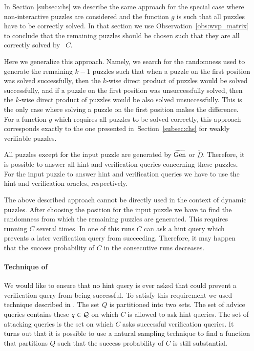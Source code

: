 In Section \ref{subsec:chs} we describe the same approach for the special case where
non-interactive puzzles are considered and the function $g$ is such that all puzzles have to be correctly solved.
In that section we use Observation~\ref{obs:wvp_matrix} to conclude that the remaining puzzles should be chosen such that they
are all correctly solved by~ $C$.

Here we generalize this approach. Namely, we search for the randomness used to generate the remaining $k\!-\!1$ puzzles
such that when a puzzle on the first position was solved successfully, then the $k$-wise direct product of puzzles would be solved successfully,
and if a puzzle on the first position was unsuccessfully solved, then the $k$-wise direct product of puzzles would be also solved unsuccessfully.
This is the only case where solving a puzzle on the first position makes the difference.
For a function $g$ which requires all puzzles to be solved correctly,
this approach corresponds exactly to the one presented in~Section~\ref{subsec:chs} for weakly verifiable puzzles.

All puzzles except for the input puzzle are generated by $\widetilde{\operatorname{\text{Gen}}}$ or $\widetilde{D}$.
Therefore, it is possible to answer all hint and verification queries concerning these puzzles.
For the input puzzle to answer hint and verification queries we have to use the hint and verification oracles, respectively.

The above described approach cannot be directly used in the context of dynamic puzzles.
After choosing the position for the input puzzle we have to find the randomness from which the remaining puzzles are generated.
This requires running $C$ several times. In one of this runs $C$ can ask a hint query which prevents a later verification query from succeeding.
Therefore, it may happen that the success probability of $C$ in the consecutive runs decreases.

\paragraph{Technique of \cite{dodis2009security}}
We would like to ensure that no hint query is ever asked that could prevent a verification query from being successful.
To satisfy this requirement we used technique described in \cite{dodis2009security}.
The set $Q$ is partitioned into two sets. The set of advice queries contains these $q \in \mathcal{Q}$ on which
$C$ is allowed to ask hint queries. The set of attacking queries is the set on which $C$ asks successful verification queries.
It turns out that it is possible to use a natural sampling technique to find a function that partitions $Q$ such that
the success probability of $C$ is still substantial.

